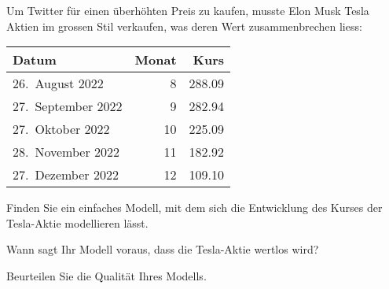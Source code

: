Um Twitter für einen überhöhten Preis zu kaufen, musste Elon Musk
Tesla Aktien im grossen Stil verkaufen, was deren Wert zusammenbrechen
liess:
\begin{center}
\begin{tabular}{|l|r|r|}
\hline
Datum&Monat&Kurs\\
\hline
26.~August 2022   & 8&288.09\\
27.~September 2022& 9&282.94\\
27.~Oktober 2022  &10&225.09\\
28.~November 2022 &11&182.92\\
27.~Dezember 2022 &12&109.10\\
\hline
\end{tabular}
\end{center}
\begin{teilaufgaben}
\item
Finden Sie ein einfaches Modell, mit dem sich die Entwicklung des
Kurses der Tesla-Aktie modellieren lässt.
\item
Wann sagt Ihr Modell voraus, dass die Tesla-Aktie wertlos wird?
\item
Beurteilen Sie die Qualität Ihres Modells.
\end{teilaufgaben}


